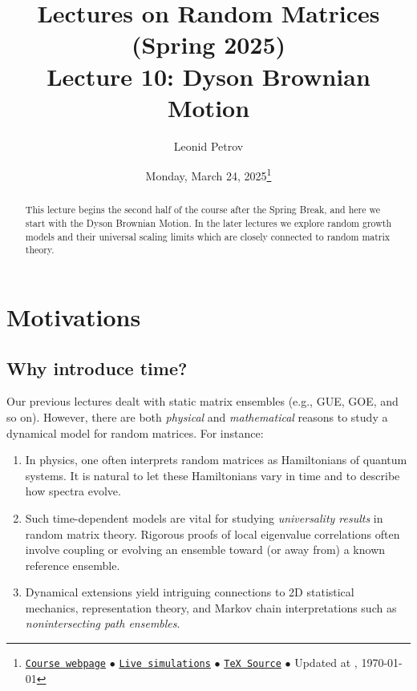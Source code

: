 \documentclass[letterpaper,11pt,oneside,reqno]{article}
\numberwithin{equation}{section}
\theoremstyle{definition}
\begin{document}
\title{Lectures on Random Matrices
(Spring 2025)
\\Lecture 10: Dyson Brownian Motion}


\date{Monday, March 24, 2025\footnote{\href{https://lpetrov.cc/rmt25/}{\texttt{Course webpage}}
$\bullet$ \href{https://lpetrov.cc/simulations/model/random-matrices/}{\texttt{Live simulations}}
$\bullet$ \href{https://lpetrov.cc/rmt25/rmt25-notes/rmt2025-l10.tex}{\texttt{TeX Source}}
$\bullet$
Updated at \currenttime, \today}}



\author{Leonid Petrov}


\maketitle

\begin{abstract}
	This lecture begins the second half of the course after the Spring Break, and
	here we start with the Dyson Brownian Motion. 
	In the later lectures we explore random growth models and their universal scaling limits
	which are closely connected to random matrix theory.
\end{abstract}

\section{Motivations}
\subsection{Why introduce time?}
Our previous lectures dealt with static matrix ensembles (e.g., GUE, GOE, and so on). However, there are both \emph{physical} and \emph{mathematical} reasons to study a dynamical model for random matrices. For instance:
\begin{enumerate}
\item In physics, one often interprets random matrices as Hamiltonians of quantum systems. It is natural to let these Hamiltonians vary in time and to describe how spectra evolve.
\item Such time-dependent models are vital for studying \emph{universality results} in random matrix theory. Rigorous proofs of local eigenvalue correlations often involve coupling or evolving an ensemble toward (or away from) a known reference ensemble.
\item Dynamical extensions yield intriguing connections to 2D statistical mechanics, representation theory, and Markov chain interpretations such as \emph{nonintersecting path ensembles}.
\end{enumerate}
\end{document}
